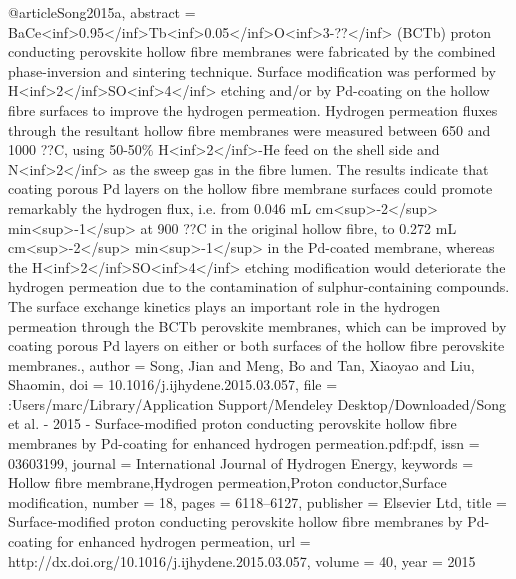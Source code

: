 @article{Song2015a,
abstract = {BaCe{\textless}inf{\textgreater}0.95{\textless}/inf{\textgreater}Tb{\textless}inf{\textgreater}0.05{\textless}/inf{\textgreater}O{\textless}inf{\textgreater}3-??{\textless}/inf{\textgreater} (BCTb) proton conducting perovskite hollow fibre membranes were fabricated by the combined phase-inversion and sintering technique. Surface modification was performed by H{\textless}inf{\textgreater}2{\textless}/inf{\textgreater}SO{\textless}inf{\textgreater}4{\textless}/inf{\textgreater} etching and/or by Pd-coating on the hollow fibre surfaces to improve the hydrogen permeation. Hydrogen permeation fluxes through the resultant hollow fibre membranes were measured between 650 and 1000 ??C, using 50-50{\%} H{\textless}inf{\textgreater}2{\textless}/inf{\textgreater}-He feed on the shell side and N{\textless}inf{\textgreater}2{\textless}/inf{\textgreater} as the sweep gas in the fibre lumen. The results indicate that coating porous Pd layers on the hollow fibre membrane surfaces could promote remarkably the hydrogen flux, i.e. from 0.046 mL cm{\textless}sup{\textgreater}-2{\textless}/sup{\textgreater} min{\textless}sup{\textgreater}-1{\textless}/sup{\textgreater} at 900 ??C in the original hollow fibre, to 0.272 mL cm{\textless}sup{\textgreater}-2{\textless}/sup{\textgreater} min{\textless}sup{\textgreater}-1{\textless}/sup{\textgreater} in the Pd-coated membrane, whereas the H{\textless}inf{\textgreater}2{\textless}/inf{\textgreater}SO{\textless}inf{\textgreater}4{\textless}/inf{\textgreater} etching modification would deteriorate the hydrogen permeation due to the contamination of sulphur-containing compounds. The surface exchange kinetics plays an important role in the hydrogen permeation through the BCTb perovskite membranes, which can be improved by coating porous Pd layers on either or both surfaces of the hollow fibre perovskite membranes.},
author = {Song, Jian and Meng, Bo and Tan, Xiaoyao and Liu, Shaomin},
doi = {10.1016/j.ijhydene.2015.03.057},
file = {:Users/marc/Library/Application Support/Mendeley Desktop/Downloaded/Song et al. - 2015 - Surface-modified proton conducting perovskite hollow fibre membranes by Pd-coating for enhanced hydrogen permeation.pdf:pdf},
issn = {03603199},
journal = {International Journal of Hydrogen Energy},
keywords = {Hollow fibre membrane,Hydrogen permeation,Proton conductor,Surface modification},
number = {18},
pages = {6118--6127},
publisher = {Elsevier Ltd},
title = {{Surface-modified proton conducting perovskite hollow fibre membranes by Pd-coating for enhanced hydrogen permeation}},
url = {http://dx.doi.org/10.1016/j.ijhydene.2015.03.057},
volume = {40},
year = {2015}
}
